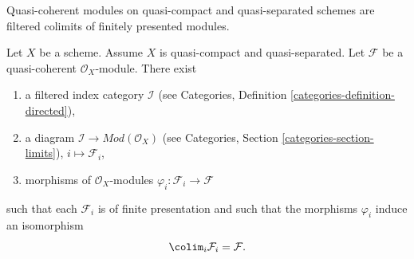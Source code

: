 %
\begin{lemma}
\label{lemma-directed-colimit-diagram-finite-presentation}
\begin{slogan}
Quasi-coherent modules on quasi-compact and quasi-separated schemes
are filtered colimits of finitely presented modules.
\end{slogan}
Let $X$ be a scheme. Assume $X$ is quasi-compact and quasi-separated.
Let $\mathcal{F}$ be a quasi-coherent $\mathcal{O}_X$-module.
There exist
\begin{enumerate}
\item a filtered index category $\mathcal{I}$ (see
Categories, Definition \ref{categories-definition-directed}),
\item a diagram $\mathcal{I} \to \textit{Mod}(\mathcal{O}_X)$ (see
Categories, Section \ref{categories-section-limits}),
$i \mapsto \mathcal{F}_i$,
\item morphisms of $\mathcal{O}_X$-modules
$\varphi_i : \mathcal{F}_i \to \mathcal{F}$
\end{enumerate}
such that each $\mathcal{F}_i$ is of finite presentation
and such that the morphisms $\varphi_i$ induce an isomorphism
$$
\colim_i \mathcal{F}_i
=
\mathcal{F}.
$$
\end{lemma}

